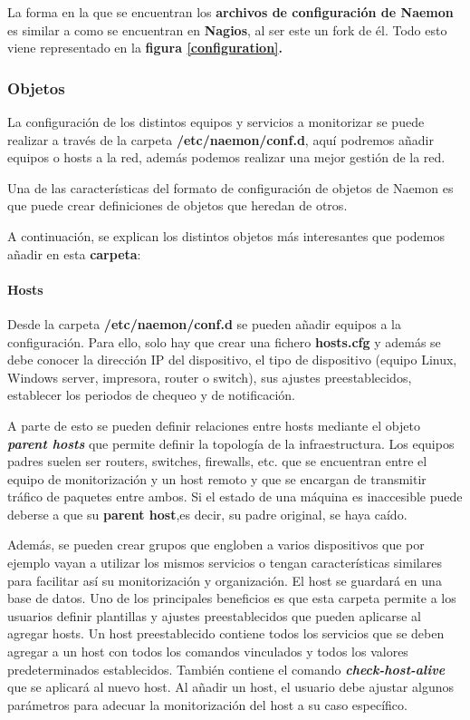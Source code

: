 La forma en la que se encuentran los \textbf{archivos de configuración de Naemon} es similar a como se encuentran en \textbf{Nagios}, al ser este un fork de él. Todo esto viene representado en la \textbf{figura \ref{configuration}.}

\subsubsection{Objetos}
La configuración de los distintos equipos y servicios a monitorizar se puede realizar a través de la carpeta \textbf{/etc/naemon/conf.d}, aquí podremos añadir equipos o hosts a la red, además podemos realizar una mejor gestión de la red.

Una de las características del formato de configuración de objetos de Naemon es que puede crear definiciones de objetos que heredan de otros.

A continuación, se explican los distintos objetos más interesantes que podemos añadir en esta \textbf{carpeta}:

\paragraph{Hosts}

Desde la carpeta \textbf{/etc/naemon/conf.d} se pueden añadir equipos a la configuración. Para ello, solo hay que crear una fichero \textbf{hosts.cfg} y además se debe conocer la dirección IP del dispositivo, el tipo de dispositivo (equipo Linux, Windows server, impresora, router o switch), sus ajustes preestablecidos, establecer los periodos de chequeo y de notificación.

A parte de esto se pueden definir relaciones entre hosts mediante el objeto \textit{\textbf{parent hosts}} que permite definir la topología de la infraestructura. Los equipos padres suelen ser routers, switches, firewalls, etc. que se encuentran entre el equipo de monitorización y
un host remoto y que se encargan de transmitir tráfico de paquetes entre ambos. Si el estado de una máquina es inaccesible puede deberse a que su \textbf{parent host},es decir, su padre original, se haya caído. \cite{naemoncfg}

Además, se pueden crear grupos que engloben a varios dispositivos que por ejemplo vayan a utilizar los mismos servicios o tengan características similares para facilitar así su monitorización y organización. El host se guardará en una base de datos.
\newpage
Uno de los principales beneficios es que esta carpeta permite a los usuarios definir plantillas y ajustes preestablecidos que pueden aplicarse al agregar hosts. Un host preestablecido contiene todos los servicios que se deben agregar a un host con todos los comandos vinculados y todos los valores predeterminados establecidos. También contiene el comando \textit{\textbf{check-host-alive}} que se aplicará al nuevo host. Al añadir un host, el usuario debe ajustar algunos parámetros para adecuar la monitorización del host a su caso específico.

